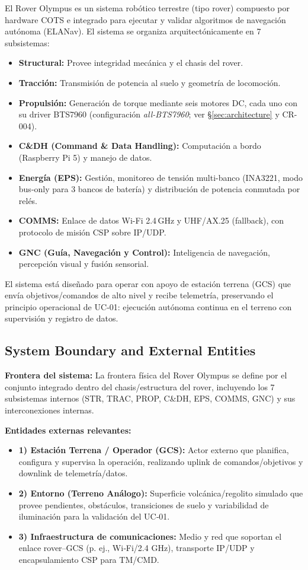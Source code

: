 El Rover Olympus es un sistema robótico terrestre (tipo rover) compuesto por hardware COTS e integrado para ejecutar y validar algoritmos de navegación autónoma (ELANav). El sistema se organiza arquitectónicamente en 7 subsistemas:
\begin{itemize}
    \item \textbf{Structural:} Provee integridad mecánica y el chasis del rover.
    \item \textbf{Tracción:} Transmisión de potencia al suelo y geometría de locomoción.
    \item \textbf{Propulsión:} Generación de torque mediante seis motores DC, cada uno con su driver BTS7960 (configuración \emph{all-BTS7960}; ver \S\ref{sec:architecture} y CR-004).
    \item \textbf{C\&DH (Command \& Data Handling):} Computación a bordo (Raspberry Pi 5) y manejo de datos.
    \item \textbf{Energía (EPS):} Gestión, monitoreo de tensión multi-banco (INA3221, modo bus-only para 3 bancos de batería) y distribución de potencia conmutada por relés.
    \item \textbf{COMMS:} Enlace de datos Wi-Fi 2.4\,GHz y UHF/AX.25 (fallback), con protocolo de misión CSP sobre IP/UDP.
    \item \textbf{GNC (Guía, Navegación y Control):} Inteligencia de navegación, percepción visual y fusión sensorial.
\end{itemize}
El sistema está diseñado para operar con apoyo de estación terrena (GCS) que envía objetivos/comandos de alto nivel y recibe telemetría, preservando el principio operacional de UC‑01: ejecución autónoma continua en el terreno con supervisión y registro de datos.

\subsection{System Boundary and External Entities}\label{subsec:system_boundary}

\textbf{Frontera del sistema:} La frontera física del Rover Olympus se define por el conjunto integrado dentro del chasis/estructura del rover, incluyendo los 7 subsistemas internos (STR, TRAC, PROP, C\&DH, EPS, COMMS, GNC) y sus interconexiones internas.

\textbf{Entidades externas relevantes:}
\begin{itemize}
    \item \textbf{1) Estación Terrena / Operador (GCS):} Actor externo que planifica, configura y supervisa la operación, realizando uplink de comandos/objetivos y downlink de telemetría/datos.
    \item \textbf{2) Entorno (Terreno Análogo):} Superficie volcánica/regolito simulado que provee pendientes, obstáculos, transiciones de suelo y variabilidad de iluminación para la validación del UC‑01.
    \item \textbf{3) Infraestructura de comunicaciones:} Medio y red que soportan el enlace rover–GCS (p. ej., Wi‑Fi/2.4 GHz), transporte IP/UDP y encapsulamiento CSP para TM/CMD.
\end{itemize}

